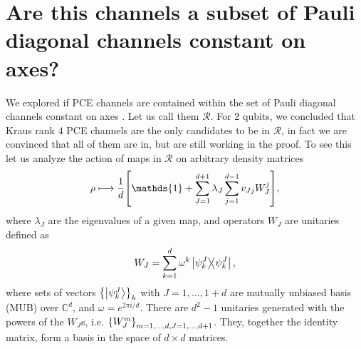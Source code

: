 \documentclass[11pt,dvipsnames]{article} %
\newcommand{\1}{\mathds{1}}
\newcommand{\R}{\mathcal{R}}
\begin{document}
\section*{Are this channels a subset of Pauli diagonal channels constant on axes?} %
We explored if PCE channels are contained within the set of Pauli diagonal
channels constant on axes \cite{nathanson2007pauli}. Let us call them
$\mathcal{R}$. For 2 qubits, we concluded that Kraus rank $4$ 
PCE channels are the only candidates to
be in $\mathcal{R}$, in fact we are convinced that all of them are in, but are
still working in the proof. 
To see this let us analyze the action of maps in $\R$ 
on arbitrary density matrices
\begin{align}
	\rho \longmapsto \frac{1}{d}\qty[\1 + \sum _{J=1}^{d+1} \lambda_J
	\sum _{j=1}^{d-1}	v_{Jj}W_J^j],
	\label{eq:ruskai-action}
\end{align}
where $\lambda_J$ are the eigenvalues of a given map, and operators $W_J$ are unitaries defined as
\begin{equation}
	W_J = \sum _{k=1}^{d}\omega^k \dyad{\psi_k^J}{\psi_k^J}, 
\end{equation}
where sets of vectors $\qty{\ket{\psi_k^J}}_k$ with $J=1,\dots, 1+d$ are mutually unbiased basis (MUB) over $\mathbb{C}^d$, and $\omega = e^{2\pi i/d}$. There are $d^2-1$ unitaries generated with the powers of the $W_J$s, i.e.
$\qty{W_J^m}_{m=1,\ldots,d,J=1,\ldots,d+1}$. They, together the identity matrix, form a basis in the space of $d\times d$ matrices.  

 
\end{document}
